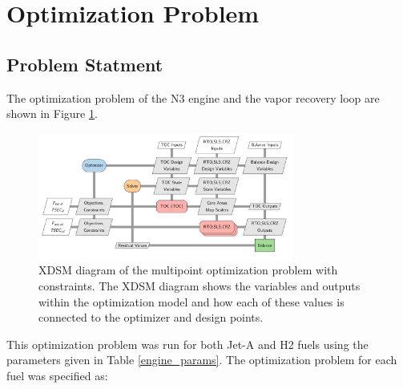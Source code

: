 \documentclass[conf]{new-aiaa}
\begin{document}
\section{Optimization Problem}
\label{sec:optprob}

\subsection{Problem Statment}
The optimization problem of the N3 engine and the vapor recovery loop are shown in Figure \ref{fig:N3_xdsm_opt}.

\begin{figure}[hbt!]
    \centering
    \includegraphics[width=0.75\textwidth]{N3_xdsm_opt.pdf}
    \caption{
        XDSM diagram of the multipoint optimization problem with constraints.
        The XDSM diagram shows the variables and outputs within the optimization model and how each of these values is connected to the optimizer and design points.}
    \label{fig:N3_xdsm_opt}
\end{figure}

This optimization problem was run for both Jet-A and H2 fuels using the parameters given in Table \ref{engine_params}.
The optimization problem for each fuel was specified as:
\end{document}
